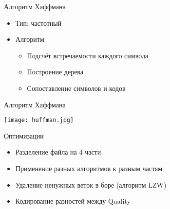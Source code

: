 \documentclass[12pt]{beamer}
\begin{document}
\begin{frame}{Алгоритм Хаффмана}

    \begin{itemize}

        \item <1->Тип: частотный
        
        \item <2->Алгоритм
        
        \begin{itemize}

            \item <3-> Подсчёт встречаемости каждого символа

            \item <4-> Построение дерева

            \item <5-> Сопоставление символов и кодов

        \end{itemize}

    \end{itemize}

\end{frame}

\begin{frame}{Алгоритм Хаффмана}

    \texttt{[image: huffman.jpg]}

\end{frame}

\begin{frame}{Оптимизации}

    \begin{itemize}

        \item <1-> Разделение файла на 4 части

        \item <2-> Применение разных алгоритмов к разным частям 

        \item <3-> Удаление ненужных веток в боре (алгоритм LZW)

        \item <4-> Кодирование разностей между Quality
    
    \end{itemize} 

\end{frame}
\end{document}
